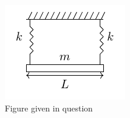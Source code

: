 \begin{enumerate}[label=\thechapter.\arabic*,ref=\thechapter.\theenumi]
\begin{figure}[h!]
    \includegraphics[width = \columnwidth]{2022/AE/63/figs/qn_fig.pdf}
    \caption{Figure given in question }
    \centering
    \label{fig: 2022_ae_63_fig_1}
\end{figure}
\solution

\end{enumerate}
